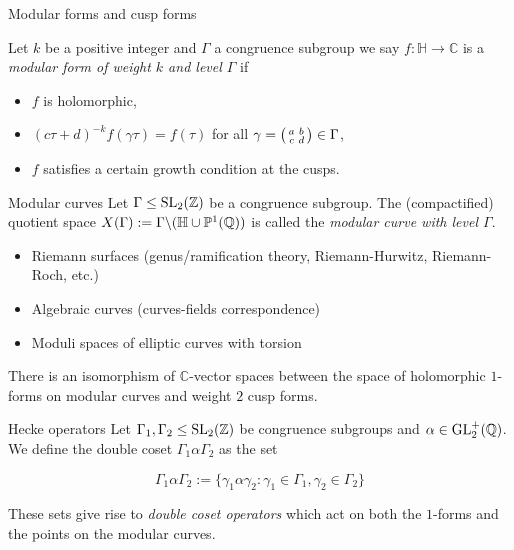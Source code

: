 \begin{frame}{Modular forms and cusp forms}
\begin{definition}
Let $k$ be a positive integer and $\Gamma$ a congruence subgroup we say $f: \mathbb{H} \rightarrow \mathbb{C}$ is a \textit{modular form of weight $k$ and level $\Gamma$} if

\begin{itemize}
\item $f$ is holomorphic,
\item $(c\tau + d)^{-k} f(\gamma \tau) = f(\tau) $ for all $\gamma = \begin{psmallmatrix} a & b \\ c & d \end{psmallmatrix} \in \Gamma$,
\item $f$ satisfies a certain growth condition at the cusps.
\end{itemize}
\end{definition}
\end{frame}

\begin{frame}{Modular curves}
Let $\Gamma \leq \operatorname{SL}_2(\mathbb{Z})$ be a congruence subgroup. The (compactified) quotient space $X(\Gamma) := \Gamma \backslash (\mathbb{H} \cup \mathbb{P}^1(\mathbb{Q}))$ is called the \textit{modular curve with level $\Gamma$}.

\begin{itemize}
\pause \item Riemann surfaces (genus/ramification theory, Riemann-Hurwitz, Riemann-Roch, etc.)
\pause \item Algebraic curves (curves-fields correspondence)
\pause \item Moduli spaces of elliptic curves with torsion
\end{itemize}

\pause 
\begin{theorem}
There is an isomorphism of $\mathbb{C}$-vector spaces between the space of holomorphic $1$-forms on modular curves and weight $2$ cusp forms.
\end{theorem}
\end{frame}

\begin{frame}{Hecke operators}
Let $\Gamma_1,\Gamma_2 \leq \operatorname{SL}_2(\mathbb{Z})$ be congruence subgroups and $\alpha \in \operatorname{GL}_2^+(\mathbb{Q})$. We define the double coset $\Gamma_1 \alpha \Gamma_2$ as the set

\[
\Gamma_1 \alpha \Gamma_2 := \{ \gamma_1 \alpha \gamma_2: \gamma_1 \in \Gamma_1, \gamma_2 \in \Gamma_2 \}
\]

These sets give rise to \textit{double coset operators} which act on both the $1$-forms and the points on the modular curves.

\end{frame}


